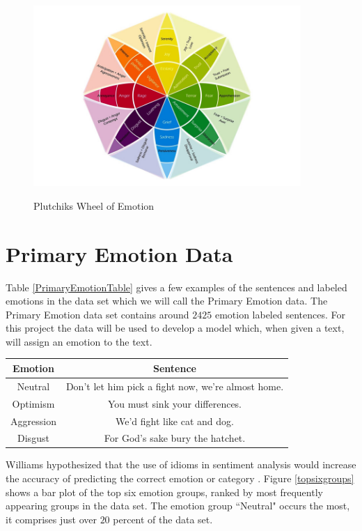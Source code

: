 \documentclass[titlepage,letterpaper]{article}
\begin{document}
\begin{figure}[ht]
	\centering
	\caption{Plutchiks Wheel of Emotion \cite{WheelofEmotion}}
	\includegraphics[width=4in]{PlutchikWheelOfEmotion.jpg}
	\label{plutchikemotionwheel}
\end{figure}

\section{Primary Emotion Data}
Table \ref{PrimaryEmotionTable} gives a few examples of the sentences and labeled emotions in the data set which we will call the Primary Emotion data. The Primary Emotion data set contains around $2425$ emotion labeled sentences. For this project the data will be used to develop a model which, when given a text, will assign an emotion to the text. 
 
 \begin{center}
 	\begin{tabular}{ |c|c| } 
 		\hline
 		Emotion & Sentence \\
 		\hline \hline
 		Neutral & Don't let him pick a fight now, we're almost home. \\
 		\hline
 		Optimism &  You must sink your differences. \\
 		\hline
 		Aggression & We'd fight like cat and dog.  \\ 
 		\hline
 		Disgust & For God's sake bury the hatchet. \\
 		\hline
 	\end{tabular}
 	\label{PrimaryEmotionTable}
 \end{center}

 
 Williams hypothesized that the use of idioms in sentiment analysis would increase the accuracy of predicting the correct emotion or category \cite{lowriwilliams}. Figure \ref{topsixgroups} shows a bar plot of the top six emotion groups, ranked by most frequently appearing groups in the data set. The emotion group ``Neutral" occurs the most, it comprises just over $20$ percent of the data set. 
 
\end{document}
